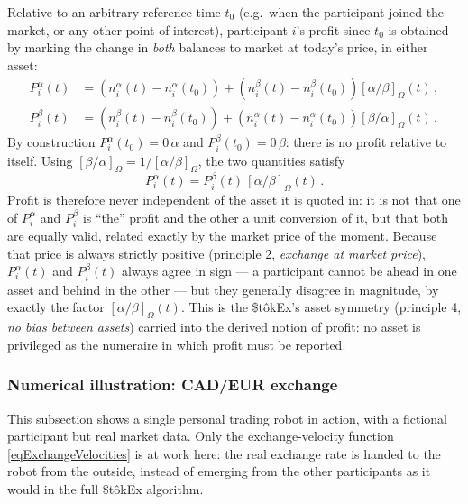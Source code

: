 \documentclass[letterpaper]{article}
\newcommand{\priceAB}{\left[\alpha / \beta\right]}
\newcommand{\priceBA}{\left[\beta / \alpha\right]}
\newcommand{\StokEx}{\$t\^{o}kEx}
\begin{document}
Relative to an arbitrary reference time $t_0$ (e.g.\ when the participant joined the market, or any other point of interest), participant $i$'s profit since $t_0$ is obtained by marking the change in \emph{both} balances to market at today's price, in either asset:
\begin{align}
    P_i^\alpha(t) &= \left(n_i^\alpha(t) - n_i^\alpha(t_0)\right) + \left(n_i^\beta(t) - n_i^\beta(t_0)\right)\priceAB_\Omega\!(t) \,, \label{eqParticipantProfitAlpha}\\
    P_i^\beta(t) &= \left(n_i^\beta(t) - n_i^\beta(t_0)\right) + \left(n_i^\alpha(t) - n_i^\alpha(t_0)\right)\priceBA_\Omega\!(t) \,. \label{eqParticipantProfitBeta}
\end{align}
By construction $P_i^\alpha(t_0) = 0\,\alpha$ and $P_i^\beta(t_0) = 0\,\beta$: there is no profit relative to itself. Using $\priceBA_\Omega = 1/\priceAB_\Omega$, the two quantities satisfy
\begin{equation}
    P_i^\alpha(t) = P_i^\beta(t)\, \priceAB_\Omega(t) \,. \label{eqProfitIdentity}
\end{equation}
Profit is therefore never independent of the asset it is quoted in: it is not that one of $P_i^\alpha$ and $P_i^\beta$ is ``the'' profit and the other a unit conversion of it, but that both are equally valid, related exactly by the market price of the moment. Because that price is always strictly positive (principle 2, \emph{exchange at market price}), $P_i^\alpha(t)$ and $P_i^\beta(t)$ always agree in sign --- a participant cannot be ahead in one asset and behind in the other --- but they generally disagree in magnitude, by exactly the factor $\priceAB_\Omega(t)$. This is the \StokEx{}'s asset symmetry (principle 4, \emph{no bias between assets}) carried into the derived notion of profit: no asset is privileged as the numeraire in which profit must be reported.


\subsubsection{Numerical illustration: CAD/EUR exchange}

This subsection shows a single personal trading robot in action, with a fictional participant but real market data. Only the exchange-velocity function \eqref{eqExchangeVelocities} is at work here: the real exchange rate is handed to the robot from the outside, instead of emerging from the other participants as it would in the full \StokEx{} algorithm.
\end{document}
